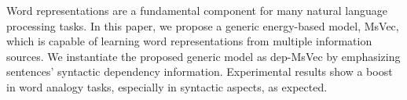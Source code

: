 Word representations are a fundamental component for many natural language processing tasks. In this paper, we propose a generic energy-based model, MsVec, which is capable of learning word representations from multiple information sources. We instantiate the proposed generic model as dep-MsVec by emphasizing sentences' syntactic dependency information. Experimental results show a boost in word analogy tasks, especially in syntactic aspects, as expected.
